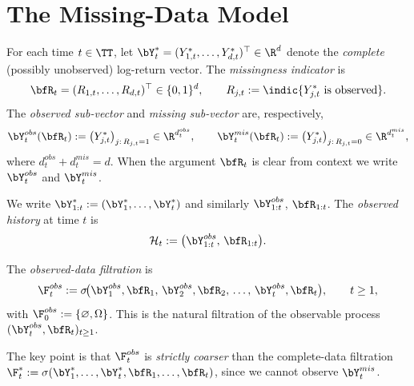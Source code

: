 \section{The Missing-Data Model}
\label{sec:missing_data_model}

\begin{definition}
\label{def:missing_data}
For each time $t\in\TT$, let
$\bY_t^*=(Y_{1,t}^*,\ldots,Y_{d,t}^*)^\top\in\R^d$ denote the
\emph{complete} (possibly unobserved) log-return vector.  The
\emph{missingness indicator} is
\[
  \bfR_t = (R_{1,t},\ldots,R_{d,t})^\top \in \{0,1\}^d,
  \qquad
  R_{j,t} := \indic{Y_{j,t}^*\text{ is observed}}.
\]
The \emph{observed sub-vector} and \emph{missing sub-vector} are,
respectively,
\[
  \bY_t^{obs}(\bfR_t)
  := \bigl(Y_{j,t}^*\bigr)_{j:\, R_{j,t}=1}
  \in \R^{d_t^{obs}},
  \qquad
  \bY_t^{mis}(\bfR_t)
  := \bigl(Y_{j,t}^*\bigr)_{j:\, R_{j,t}=0}
  \in \R^{d_t^{mis}},
\]
where $d_t^{obs}+d_t^{mis}=d$.  When the argument $\bfR_t$ is clear from
context we write $\bY_t^{obs}$ and $\bY_t^{mis}$.
\end{definition}

\begin{notation}
\label{not:history}
We write $\bY_{1:t}^* := (\bY_1^*,\ldots,\bY_t^*)$ and similarly
$\bY_{1:t}^{obs}$, $\bfR_{1:t}$.  The \emph{observed history} at time $t$ is
\[
  \mathcal{H}_t := \bigl(\bY_{1:t}^{obs},\,\bfR_{1:t}\bigr).
\]
\end{notation}

\begin{definition}
\label{def:obs_filtration}
The \emph{observed-data filtration} is
\[
  \F_t^{obs}
  := \sigma\!\bigl(\bY_1^{obs},\bfR_1,\,
                   \bY_2^{obs},\bfR_2,\,\ldots,\,
                   \bY_t^{obs},\bfR_t\bigr),
  \qquad t\ge 1,
\]
with $\F_0^{obs}:=\{\varnothing,\Omega\}$.  This is the natural filtration of
the observable process $(\bY_t^{obs},\bfR_t)_{t\ge 1}$.
\end{definition}

The key point is that $\F_t^{obs}$ is \emph{strictly coarser} than the
complete-data filtration
$\F_t^*:=\sigma(\bY_1^*,\ldots,\bY_t^*,\bfR_1,\ldots,\bfR_t)$, since
we cannot observe $\bY_t^{mis}$.

